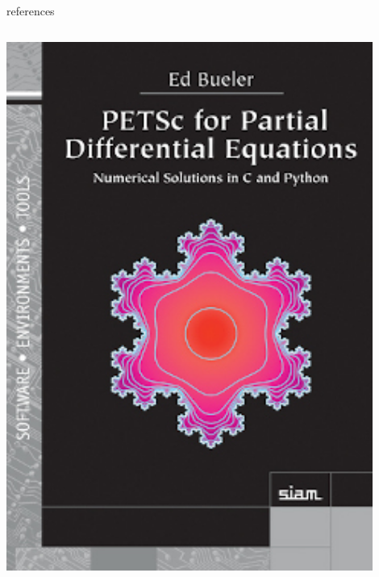 \documentclass[10pt,
               svgnames,
               hyperref={colorlinks,citecolor=DeepPink4,linkcolor=FireBrick,urlcolor=Maroon},
               usepdftitle=false]{beamer}
\begin{document}
\begin{frame}{references}
\begin{columns}
\begin{column}{0.17\textwidth}
\vspace{7mm}
\hfill \includegraphics[width=0.9\textwidth]{images/bueler.jpg}

\vspace{20mm}
\end{column}
\end{columns}
\end{frame}
\end{document}
